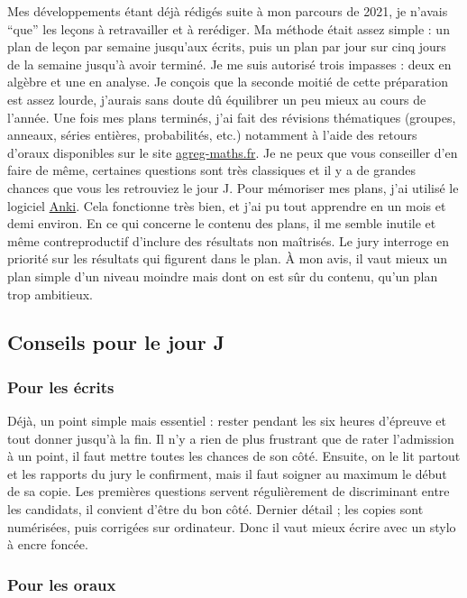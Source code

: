   Mes développements étant déjà rédigés suite à mon parcours de 2021, je n'avais ``que'' les leçons à retravailler et à rerédiger.
  \newpar
  Ma méthode était assez simple : un plan de leçon par semaine jusqu'aux écrits, puis un plan par jour sur cinq jours de la semaine jusqu'à avoir terminé. Je me suis autorisé trois impasses : deux en algèbre et une en analyse. Je conçois que la seconde moitié de cette préparation est assez lourde, j'aurais sans doute dû équilibrer un peu mieux au cours de l'année. Une fois mes plans terminés, j'ai fait des révisions thématiques (groupes, anneaux, séries entières, probabilités, etc.) notamment à l'aide des retours d'oraux disponibles sur le site \href{https://agreg-maths.fr}{agreg-maths.fr}. Je ne peux que vous conseiller d'en faire de même, certaines questions sont très classiques et il y a de grandes chances que vous les retrouviez le jour J.
  \newpar
  Pour mémoriser mes plans, j'ai utilisé le logiciel \href{https://apps.ankiweb.net/}{Anki}. Cela fonctionne très bien, et j'ai pu tout apprendre en un mois et demi environ.
  \newpar
  En ce qui concerne le contenu des plans, il me semble inutile et même contreproductif d'inclure des résultats non maîtrisés. Le jury interroge en priorité sur les résultats qui figurent dans le plan. À mon avis, il vaut mieux un plan simple d'un niveau moindre mais dont on est sûr du contenu, qu'un plan trop ambitieux.

  \subsection{Conseils pour le jour J}

  \subsubsection{Pour les écrits}

  Déjà, un point simple mais essentiel : rester pendant les six heures d'épreuve et tout donner jusqu'à la fin. Il n'y a rien de plus frustrant que de rater l'admission à un point, il faut mettre toutes les chances de son côté.
  \newpar
  Ensuite, on le lit partout et les rapports du jury le confirment, mais il faut soigner au maximum le début de sa copie. Les premières questions servent régulièrement de discriminant entre les candidats, il convient d'être du bon côté.
  \newpar
  Dernier détail ; les copies sont numérisées, puis corrigées sur ordinateur. Donc il vaut mieux écrire avec un stylo à encre foncée.

  \subsubsection{Pour les oraux}

